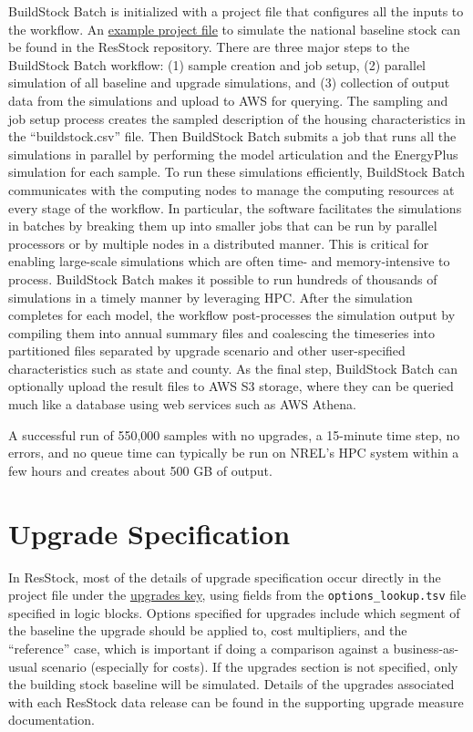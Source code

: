 BuildStock Batch is initialized with a project file that configures all the inputs to the workflow. An \href{https://github.com/NREL/resstock/blob/develop/project_national/national_baseline.yml}{example project file} to simulate the national baseline stock can be found in the ResStock repository. There are three major steps to the BuildStock Batch workflow: (1) sample creation and job setup, (2) parallel simulation of all baseline and upgrade simulations, and (3) collection of output data from the simulations and upload to AWS for querying. The sampling and job setup process creates the sampled description of the housing characteristics in the ``buildstock.csv'' file. Then BuildStock Batch submits a job that runs all the simulations in parallel by performing the model articulation and the EnergyPlus simulation for each sample. To run these simulations efficiently, BuildStock Batch communicates with the computing nodes to manage the computing resources at every stage of the workflow. In particular, the software facilitates the simulations in batches by breaking them up into smaller jobs that can be run by parallel processors or by multiple nodes in a distributed manner. This is critical for enabling large-scale simulations which are often time- and memory-intensive to process. BuildStock Batch makes it possible to run hundreds of thousands of simulations in a timely manner by leveraging HPC. After the simulation completes for each model, the workflow post-processes the simulation output by compiling them into annual summary files and coalescing the timeseries into partitioned files separated by upgrade scenario and other user-specified characteristics such as state and county. As the final step, BuildStock Batch can optionally upload the result files to AWS S3 storage, where they can be queried much like a database using web services such as AWS Athena.

A successful run of 550,000 samples with no upgrades, a 15-minute time step, no errors, and no queue time can typically be run on NREL's HPC system within a few hours and creates about 500 GB of output. 

\section{Upgrade Specification}\label{sec:upgrades}
In ResStock, most of the details of upgrade specification occur directly in the project file under the \href{https://buildstockbatch.readthedocs.io/en/v2023.10.0/project_defn.html#upgrade-scenarios}{upgrades key}, using fields from the \texttt{options\_lookup.tsv} file specified in logic blocks. Options specified for upgrades include which segment of the baseline the upgrade should be applied to, cost multipliers, and the ``reference'' case, which is important if doing a comparison against a business-as-usual scenario (especially for costs). If the upgrades section is not specified, only the building stock baseline will be simulated. Details of the upgrades associated with each ResStock data release can be found in the supporting upgrade measure documentation.

